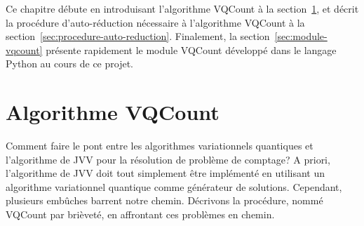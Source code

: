 Ce chapitre débute en introduisant l'algorithme VQCount à la section~\ref{sec:algorithme-vqcount}, et décrit la procédure d'auto-réduction nécessaire à l'algorithme VQCount à la section~\ref{sec:procedure-auto-reduction}. Finalement, la section~\ref{sec:module-vqcount} présente rapidement le module VQCount développé dans le langage Python au cours de ce projet.


\section{Algorithme VQCount}
\label{sec:algorithme-vqcount}

Comment faire le pont entre les algorithmes variationnels quantiques et l'algorithme de JVV pour la résolution de problème de comptage? A priori, l'algorithme de JVV doit tout simplement être implémenté en utilisant un algorithme variationnel quantique comme générateur de solutions. Cependant, plusieurs embûches barrent notre chemin. Décrivons la procédure, nommé VQCount par brièveté, en affrontant ces problèmes en chemin.

